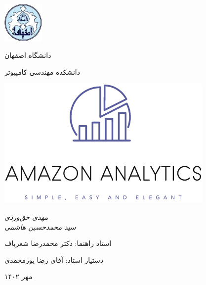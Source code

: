 \documentclass[11pt, oneside]{book}
\begin{document}
\begin{titlepage}
    \centering
    \includegraphics[width=2cm, height=2cm]{../images/logo}\par
    \vspace{2mm}            دانشگاه اصفهان \par
    دانشکده مهندسی کامپیوتر \par
    
    \vspace{1cm}
    \includegraphics{../images/alogo} \par
    \vspace{3cm}
    {\small\itshape                مهدی حق‌وردی\\
        سید محمدحسین هاشمی \par}
    
    \vfill \par	\vfill
    
    \vfill            استاد راهنما:‌ دکتر محمدرضا شعرباف \par
    دستیار استاد:‌ آقای رضا پورمحمدی
    \vfill
    
    {\large مهر ۱۴۰۲\par}
\end{titlepage}
\end{document}
